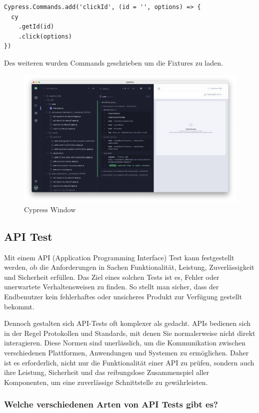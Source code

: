 \begin{lstlisting}
Cypress.Commands.add('clickId', (id = '', options) => {
  cy
    .getId(id)
    .click(options)
})
\end{lstlisting}

Des weiteren wurden Commands geschrieben um die Fixtures zu laden.

\begin{figure}[h!]
    \centering
    \includegraphics[width=1\linewidth]{pics/cypress-overview.png}
    \caption{Cypress Window}
    \label{fig:enter-label}
\end{figure}

\cite{Cypress_test}
\subsection{API Test}
Mit einem API (Application Programming Interface) Test kann festgestellt werden, ob die Anforderungen in Sachen Funktionalität, Leistung, Zuverlässigkeit und Sicherheit erfüllen. Das Ziel eines solchen Tests ist es, Fehler oder unerwartete Verhaltensweisen zu finden. So stellt man sicher, dass der Endbenutzer kein fehlerhaftes oder unsicheres Produkt zur Verfügung gestellt bekommt. 

Dennoch gestalten sich API-Tests oft komplexer als gedacht. APIs bedienen sich in der Regel Protokollen und Standards, mit denen Sie normalerweise nicht direkt interagieren. Diese Normen sind unerlässlich, um die Kommunikation zwischen verschiedenen Plattformen, Anwendungen und Systemen zu ermöglichen. Daher ist es erforderlich, nicht nur die Funktionalität einer API zu prüfen, sondern auch ihre Leistung, Sicherheit und das reibungslose Zusammenspiel aller Komponenten, um eine zuverlässige Schnittstelle zu gewährleisten.
\newpage
\subsubsection{Welche verschiedenen Arten von API Tests gibt es?}

